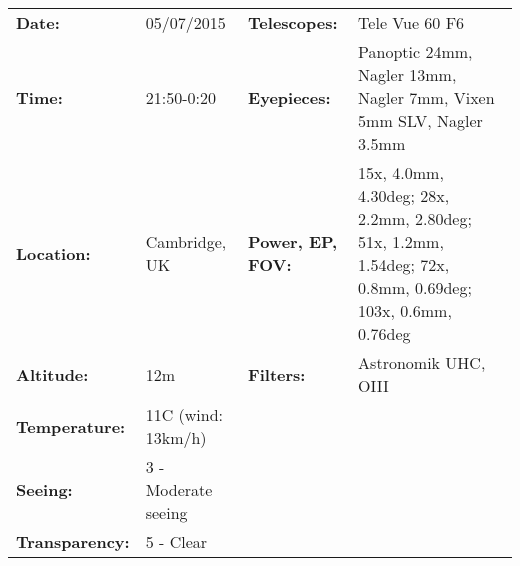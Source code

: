 \begin{tabular}{ p{0.9in} p{1.3in} p{1.2in} p{5.2in}}
{\bf Date:} & 05/07/2015 & {\bf Telescopes:} & Tele Vue 60 F6 \\ 
{\bf Time:} & 21:50-0:20 & {\bf Eyepieces:} & Panoptic 24mm, Nagler 13mm, Nagler 7mm, Vixen 5mm SLV, Nagler 3.5mm \\ 
{\bf Location:} & Cambridge, UK & {\bf Power, EP, FOV:} & 15x, 4.0mm, 4.30deg; 28x, 2.2mm, 2.80deg; 51x, 1.2mm, 1.54deg; 72x, 0.8mm, 0.69deg; 103x, 0.6mm, 0.76deg \\ 
{\bf Altitude:} & 12m & {\bf Filters:} & Astronomik UHC, OIII \\ 
{\bf Temperature:} & 11C (wind: 13km/h) & & \\ 
{\bf Seeing:} & 3 - Moderate seeing & & \\ 
{\bf Transparency:} & 5 - Clear & & \\ 
\end{tabular}
